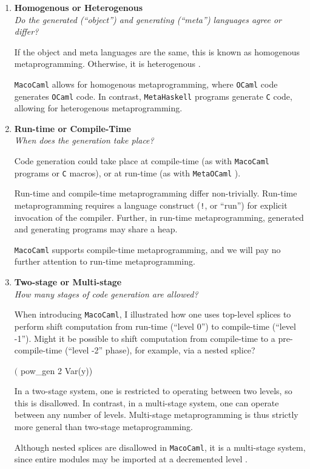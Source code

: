 \begin{enumerate}
  \item \textbf{\textsf{Homogenous or Heterogenous}}\\
         \textit{Do the generated (``object'') and generating (``meta'') languages agree or differ?}
  
        If the object and meta languages are the same, this is known as {homogenous} metaprogramming. Otherwise, it is {heterogenous} \citep{kiselyov-2024}.

        \texttt{MacoCaml} allows for homogenous metaprogramming, where \texttt{OCaml} code generates \texttt{OCaml} code. In contrast, \texttt{MetaHaskell} \citep{mainland-2012} programs generate \texttt{C} code, allowing for heterogenous metaprogramming. 

  \item \textbf{\textsf{Run-time or Compile-Time}} \\
        \textit{When does the generation take place?}

        Code generation could take place at compile-time (as with \texttt{MacoCaml} programs or \texttt{C} macros), or at run-time (as with \texttt{MetaOCaml} \citep{kiselyov-14}). 

        
        Run-time and compile-time metaprogramming differ non-trivially. Run-time metaprogramming requires a language construct (\texttt{!}, or ``run'') for explicit invocation of the compiler. Further, in run-time metaprogramming, generated and generating programs may share a heap. 

        \texttt{MacoCaml} supports compile-time metaprogramming, and we will pay no further attention to run-time metaprogramming.
        
  \item \textbf{\textsf{Two-stage or Multi-stage}} \\
  \textit{How many stages of code generation are allowed?}

  When introducing \texttt{MacoCaml}, I illustrated how one uses top-level splices to perform shift computation from run-time (``level 0'') to compile-time (``level -1''). Might it be possible to shift computation from compile-time to a pre-compile-time (``level -2'' phase), for example, via a nested splice?
  \begin{macocaml}
$($ pow_gen 2 Var(y))
  \end{macocaml}
  In a two-stage system, one is restricted to operating between two levels, so this is disallowed. In contrast, in a multi-stage system, one can operate between any number of levels. Multi-stage metaprogramming is thus strictly more general than two-stage metaprogramming.
  
  Although nested splices are disallowed in \texttt{MacoCaml}, it is a multi-stage system, since entire modules may be imported at a decremented level \citep{xie-2023}. 
\end{enumerate}
  
